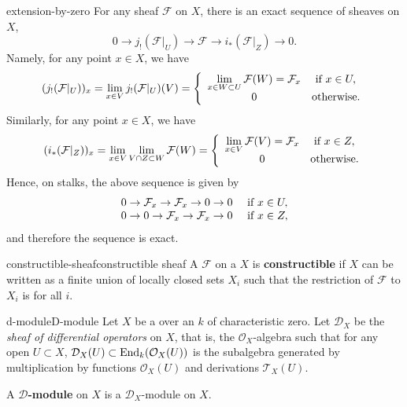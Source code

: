 \begin{example}{extension-by-zero}
    For any sheaf $\mathcal{F}$ on $X$, there is an exact sequence of sheaves on $X$,
    \[ 0 \to j_!(\mathcal{F}|_U) \to \mathcal{F} \to i_*(\mathcal{F}|_Z) \to 0 . \]
    Namely, for any point $x \in X$, we have
    \[ (j_!(\mathcal{F}|_U))_x = \lim_{x \in V} j_!(\mathcal{F}|_U)(V) = \left\{ \begin{array}{cl}
        \lim\limits_{x \in W \subset U} \mathcal{F}(W) = \mathcal{F}_x & \textup{ if } x \in U, \\
        0 & \textup{otherwise} .
    \end{array} \right. \]
    Similarly, for any point $x \in X$, we have
    \[ (i_*(\mathcal{F}|_Z))_x = \lim_{x \in V} \lim_{V \cap Z \subset W} \mathcal{F}(W) = \left\{ \begin{array}{cl}
        \lim\limits_{x \in V} \mathcal{F}(V) = \mathcal{F}_x & \textup{ if } x \in Z, \\
        0 & \textup{otherwise} .
    \end{array} \right. \]
    Hence, on stalks, the above sequence is given by
    \[ \begin{array}{cl}
        0 \to \mathcal{F}_x \to \mathcal{F}_x \to 0 \to 0 & \textup{ if } x \in U , \\
        0 \to 0 \to \mathcal{F}_x \to \mathcal{F}_x \to 0 & \textup{ if } x \in Z ,
    \end{array} \]
    and therefore the sequence is exact.
\end{example}

\begin{topic}{constructible-sheaf}{constructible sheaf}
    A  $\mathcal{F}$ on a  $X$ is \textbf{constructible} if $X$ can be written as a finite union of locally closed sets $X_i$ such that the restriction of $\mathcal{F}$ to $X_i$ is  for all $i$.
\end{topic}

\begin{topic}{d-module}{D-module}
    Let $X$ be a   over an  $k$ of characteristic zero. Let $\mathcal{D}_X$ be the \textit{sheaf of differential operators} on $X$, that is, the $\mathcal{O}_X$-algebra such that for any open $U \subset X$, $\mathcal{D}_X(U) \subset \textup{End}_k(\mathcal{O}_X(U))$ is the subalgebra generated by multiplication by functions $\mathcal{O}_X(U)$ and derivations $\mathcal{T}_X(U)$.
    
    A \textbf{$\mathcal{D}$-module} on $X$ is a $\mathcal{D}_X$-module on $X$.
\end{topic}

